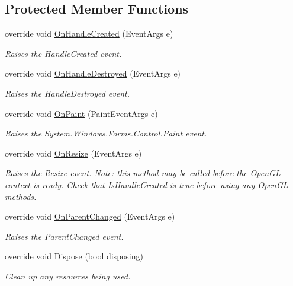\subsection*{Protected Member Functions}
\begin{DoxyCompactItemize}
\item 
override void \hyperlink{class_open_t_k_1_1_g_l_control_ac30882f431ab6a71aeacf518af9d1bf2}{On\-Handle\-Created} (Event\-Args e)
\begin{DoxyCompactList}\small\item\em Raises the Handle\-Created event.\end{DoxyCompactList}\item 
override void \hyperlink{class_open_t_k_1_1_g_l_control_a6cd12f797a002754dcf4b499fc5d815c}{On\-Handle\-Destroyed} (Event\-Args e)
\begin{DoxyCompactList}\small\item\em Raises the Handle\-Destroyed event.\end{DoxyCompactList}\item 
override void \hyperlink{class_open_t_k_1_1_g_l_control_af06219a3bad044edb6a2727bde3d68bd}{On\-Paint} (Paint\-Event\-Args e)
\begin{DoxyCompactList}\small\item\em Raises the System.\-Windows.\-Forms.\-Control.\-Paint event. \end{DoxyCompactList}\item 
override void \hyperlink{class_open_t_k_1_1_g_l_control_a388a7837200e75a11d014870e279b9f7}{On\-Resize} (Event\-Args e)
\begin{DoxyCompactList}\small\item\em Raises the Resize event. Note\-: this method may be called before the Open\-G\-L context is ready. Check that Is\-Handle\-Created is true before using any Open\-G\-L methods. \end{DoxyCompactList}\item 
override void \hyperlink{class_open_t_k_1_1_g_l_control_a264f947e2033bb0cc8cb16a91678f1ff}{On\-Parent\-Changed} (Event\-Args e)
\begin{DoxyCompactList}\small\item\em Raises the Parent\-Changed event. \end{DoxyCompactList}\item 
override void \hyperlink{class_open_t_k_1_1_g_l_control_aaf00c16561f4de2544c8c53a837e16f0}{Dispose} (bool disposing)
\begin{DoxyCompactList}\small\item\em Clean up any resources being used. \end{DoxyCompactList}\end{DoxyCompactItemize}
